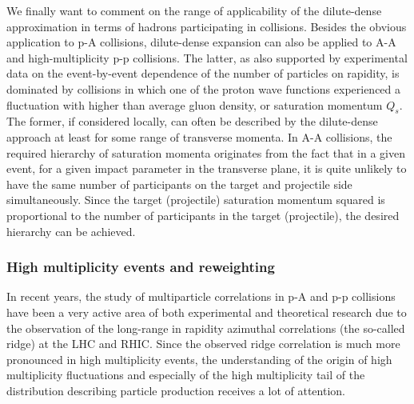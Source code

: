 We finally want to comment on the range of applicability  of the 
dilute-dense approximation in terms of hadrons participating in collisions. 
Besides the obvious application to p-A collisions, dilute-dense expansion 
can also be applied to A-A  and high-multiplicity p-p collisions. 
The latter, as also supported by experimental data on 
the event-by-event dependence of the number of particles on rapidity,   
is dominated by collisions in which one of the proton wave functions experienced 
a fluctuation with higher than average gluon density, or saturation momentum $Q_s$. 
The former, if considered locally, can often be described by the 
dilute-dense approach at least for some range of transverse momenta. 
In A-A collisions, the required hierarchy of saturation momenta originates from 
the fact that in a given event, for a given impact parameter in the transverse plane, it is quite unlikely
to have the same number of participants on the target and projectile side simultaneously. 
Since the target (projectile) saturation momentum squared is proportional to the number 
of participants in the target (projectile), the desired hierarchy can be achieved.   




\subsubsection*{High multiplicity events and reweighting}
In recent years, the study of multiparticle correlations in 
p-A and p-p collisions have been a very active 
area of both experimental and theoretical research 
due to the observation of the long-range in rapidity 
azimuthal correlations (the so-called ridge)
at the LHC and RHIC.   
Since the observed ridge correlation is much more pronounced in high multiplicity
events, the understanding of the origin of high multiplicity
fluctuations and especially of the high multiplicity tail of the distribution describing 
particle production  
receives a lot of attention. 

